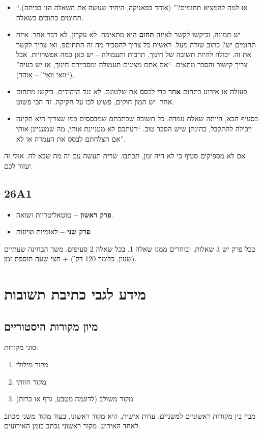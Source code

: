 \documentclass[a4paper]{book}
\begin{document}
	\begin{itemize}
		\item ``אז למה להמציא תחומים?'' (אוהד בפאניקה, היחיד שעשה את השאלה הזו בכיתה). תחומים כתובים בשאלה. 
		\item יש תמונה, וביקשו לקשר לאיזה \textbf{תחום} היא מתאימה. לא עקרון, לא דבר אחר. איזה תחומים יש? כתוב שורה מעל. ראשית כל צריך להסביר מה זה התחוםפ, ואז צריך לקשר את זה. יכולה להיות תשובה של חינוך, תרבות ותעמולה – יש כאן כמה אפשרויות. אבל צריך קישור והסבר מתאים. ``אם אתם מציגים תעמולה ומסביירם חינוך, אז יש בעיה'' (``וואי וואי'' – אוהד). 
		\item פעולה או אירוע בתחום \textbf{אחר} כדי לבסס את שלטונם. \textit{לא נגד היהודים}. ביקשו מתחום אחר. יש המון חוקים, פשוט לכו על חקיקה. זה הכי פשוט. 
		\item בסעיף הבא, הייתה שאלת עמדה. כל תשובה שכתבתם שמבססים כמו שצריך היא תקינה ויכולה להתקבל, בהינתן שיש הסבר טוב. ``דעתכם לא מעניינת אותי, מה שמעניינן אותי אם הצלחתם לבסס את העמדה או לא''. 
	\end{itemize}
	
	
	אם לא מספיקים סעיף כי לא היה זמן, תכתבו. שרית תעשה עם זה מה שבא לה. אולי זה יעזור לכם. 
	
	
	\subsection{26A1}
	\begin{itemize}
		\item \textbf{פרק ראשון – }טוטאליטריות ושואה. 
		\item \textbf{פרק שני – }לאומיות וציונות. 
	\end{itemize}
	בכל פרק יש 3 שאלות, ובוחרים ממנו שאלה 1. בכל שאלה 2 סעיפים. משך הבחינה שעתיים (שעון, כלומר 120 דק') + חצי שעה תוספת זמן. 
	
	
	\section{מידע לגבי כתיבת תשובות}
	
	\subsection{מיון מקורות היסטוריים}
	סוגי מקורות: 
	\begin{enumerate}
		\item מקור מילולי
		\item מקור חזותי
		\item מקור משולב (לדוגמה מטבע, גרף או כרזה)
	\end{enumerate}
	מבין בין מקורות ראשוניים למשניים; עדות אישית, היא מקור ראשוני, בעוד מקור משני מכתב לאחד האירוע. מקור ראשוני נכתב בזמן האירועים. 
	
\end{document}
